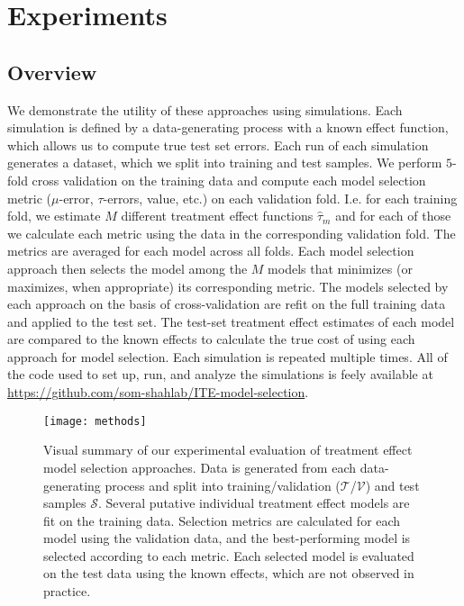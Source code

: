 \section{Experiments}
\label{simulations}

\subsection{Overview}

We demonstrate the utility of these approaches using simulations. Each simulation is defined by a data-generating process with a known effect function, which allows us to compute true test set errors. Each run of each simulation generates a dataset, which we split into training and test samples. We perform $5$-fold cross validation on the training data and compute each model selection metric ($\mu$-error, $\tau$-errors, value, etc.) on each validation fold. I.e. for each training fold, we estimate $M$ different treatment effect functions $\hat\tau_m$ and for each of those we calculate each metric using the data in the corresponding validation fold. The metrics are averaged for each model across all folds. Each model selection approach then selects the model among the $M$ models that minimizes (or maximizes, when appropriate) its corresponding metric. The models selected by each approach on the basis of cross-validation are refit on the full training data and applied to the test set. The test-set treatment effect estimates of each model are compared to the known effects to calculate the true cost of using each approach for model selection. Each simulation is repeated multiple times. All of the code used to set up, run, and analyze the simulations is feely available at \url{https://github.com/som-shahlab/ITE-model-selection}.

\begin{figure}
\centering
\texttt{[image: methods]}
\caption{Visual summary of our experimental evaluation of treatment effect model selection approaches. Data is generated from each data-generating process and split into training/validation ($\mathcal{T}$/$\mathcal{V}$) and test samples $\mathcal{S}$. Several putative individual treatment effect models are fit on the training data. Selection metrics are calculated for each model using the validation data, and the best-performing model is selected according to each metric. Each selected model is evaluated on the test data using the known effects, which are not observed in practice.}
\end{figure}

